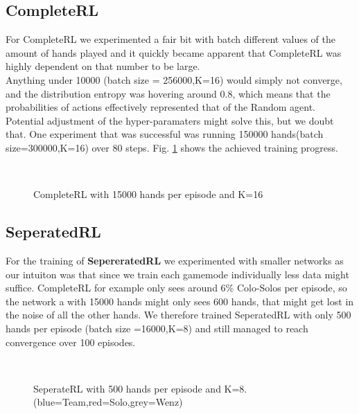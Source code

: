 \subsection{CompleteRL}
For CompleteRL we experimented a fair bit with batch different values of the amount of hands played and it quickly
became apparent that CompleteRL was highly dependent on that number to be large.\\
Anything under 10000 (batch size = 256000,K=16) would simply not converge, and the distribution entropy was hovering
around 0.8, which means that the probabilities of actions effectively represented that of the Random agent.\\
Potential adjustment of the hyper-paramaters might solve this, but we doubt that.
\newline
One experiment that was successful was running 150000 hands(batch size=300000,K=16) over 80 steps.
Fig. \ref{fig:15comp} shows the achieved training progress.
\begin{figure}[!ht]
    \centering
    \quad
    \\
    \quad
    \caption{CompleteRL with 15000 hands per episode and K=16}
    \label{fig:15comp}
\end{figure}

\subsection{SeperatedRL}
For the training of \textbf{SepereratedRL} we experimented with smaller networks as our intuiton was that since we
train each gamemode individually less data might suffice.
CompleteRL for example only sees around 6\% Colo-Solos per episode, so the network a with 15000 hands might only sees
600 hands, that might get lost in the noise of all the other hands.
We therefore trained SeperatedRL with only 500 hands per episode (batch size =16000,K=8) and still managed to
reach convergence over 100 episodes.
\begin{figure}[!ht]
    \centering
    \quad
    \\
    \quad
    \caption{SeperateRL with 500 hands per episode and K=8.(blue=Team,red=Solo,grey=Wenz)}
    \label{fig:500sep}
\end{figure}


